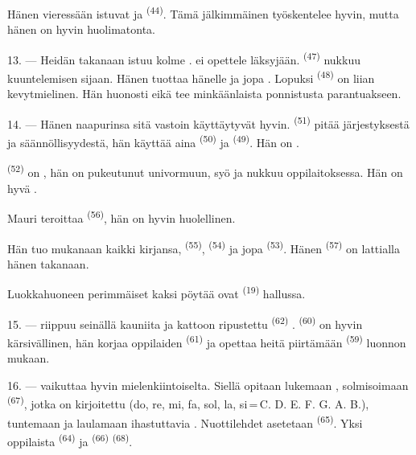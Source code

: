 Hänen vieressään istuvat  ja 
\textsuperscript{(44)}. Tämä jälkimmäinen työskentelee hyvin, mutta hänen
 on hyvin huolimatonta.

13. --- Heidän takanaan istuu kolme .  ei
opettele läksyjään.  \textsuperscript{(47)} nukkuu kuuntelemisen
sijaan. Hänen  tuottaa hänelle  ja jopa
. Lopuksi  \textsuperscript{(48)} on
liian kevytmielinen. Hän  huonosti eikä tee minkäänlaista
ponnistusta parantuakseen.

14. --- Hänen naapurinsa sitä vastoin käyttäytyvät hyvin. 
\textsuperscript{(51)} pitää järjestyksestä ja säännöllisyydestä, hän käyttää
aina  \textsuperscript{(50)} ja 
\textsuperscript{(49)}. Hän on .

 \textsuperscript{(52)} on , hän on
pukeutunut univormuun, syö ja nukkuu oppilaitoksessa. Hän on hyvä
.

Mauri teroittaa  
\textsuperscript{(56)}, hän on hyvin huolellinen.

Hän tuo mukanaan kaikki kirjansa,  \textsuperscript{(55)},
 \textsuperscript{(54)} ja jopa
 \textsuperscript{(53)}. Hänen
 \textsuperscript{(57)} on lattialla hänen takanaan.

Luokkahuoneen perimmäiset kaksi pöytää ovat 
\textsuperscript{(19)} hallussa.

\VUsaut{4.6mm}
\VUsaut{3.4mm}

15. ---  riippuu seinällä kauniita  ja
kattoon ripustettu  \textsuperscript{(62)}
.  \textsuperscript{(60)} on hyvin
kärsivällinen, hän korjaa oppilaiden 
\textsuperscript{(61)} ja opettaa heitä piirtämään 
\textsuperscript{(59)} luonnon mukaan.

16. ---  vaikuttaa hyvin mielenkiintoiselta. Siellä opitaan
lukemaan , solmisoimaan 
\textsuperscript{(67)}, jotka on kirjoitettu  (do, re,
mi, fa, sol, la, si\,=\,C. D. E. F. G. A. B.), tuntemaan
 ja laulamaan ihastuttavia .
Nuottilehdet asetetaan  \textsuperscript{(65)}. Yksi
oppilaista  \textsuperscript{(64)} ja
 \textsuperscript{(66)} 
\textsuperscript{(68)}.

